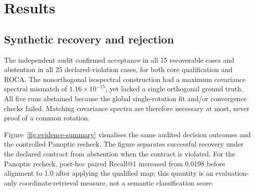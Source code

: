 \documentclass[10pt,a4paper]{article}
\begin{document}
\begin{table}[t]\centering\small\caption{Primary audited evidence under the stated fitting and evaluation conditions.}\end{table}

\section{Results}
\subsection{Synthetic recovery and rejection}
The independent audit confirmed acceptance in all 15 recoverable cases and abstention in all 25 declared-violation cases, for both core qualification and ROCA. The nonorthogonal isospectral construction had a maximum covariance spectral mismatch of $1.16\times10^{-15}$, yet lacked a single orthogonal ground truth. All five runs abstained because the global single-rotation fit and/or convergence checks failed. Matching covariance spectra are therefore necessary at most, never proof of a common rotation.

Figure~\ref{fig:evidence-summary} visualises the same audited decision outcomes and the controlled Panoptic recheck. The figure separates successful recovery under the declared contract from abstention when the contract is violated. For the Panoptic recheck, post-hoc paired Recall@1 increased from 0.0198 before alignment to 1.0 after applying the qualified map; this quantity is an evaluation-only coordinate-retrieval measure, not a semantic classification score.
\end{document}
